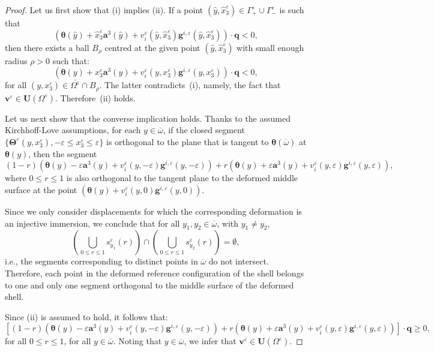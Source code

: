 \documentclass[10pt,a4paper]{amsart}
\begin{document}
\begin{proof}
	Let us first show that (i) implies (ii).
	If a point $(\hat{y},\hat{x}_3^\varepsilon) \in \Gamma^\varepsilon_+ \cup \Gamma^\varepsilon_{-}$ is such that
	$$
	(\bm{\theta}(\hat{y})+\hat{x}_3^\varepsilon \bm{a}^3(\hat{y}) +v_i^\varepsilon(\hat{y},\hat{x}_3^\varepsilon)\bm{g}^{i,\varepsilon}(\hat{y},\hat{x}_3^\varepsilon)) \cdot\bm{q} <0,
	$$
	then there exists a ball $B_\rho$ centred at the given point $(\hat{y},\hat{x}_3^\varepsilon)$ with small enough radius $\rho>0$ such that:
	$$
	(\bm{\theta}(y)+ x_3^\varepsilon \bm{a}^3(y) +v_i^\varepsilon(y,x_3^\varepsilon)\bm{g}^{i,\varepsilon}(y,x_3^\varepsilon)) \cdot\bm{q} <0,
	$$
	for all $(y,x_3^\varepsilon) \in \overline{\Omega^\varepsilon}\cap B_\rho$. The latter contradicts~(i), namely, the fact that $\bm{v}^\varepsilon \in \bm{U}(\Omega^\varepsilon)$. Therefore~(ii) holds.
	
	Let us next show that the converse implication holds. Thanks to the assumed Kirchhoff-Love assumptions, for each $y \in\overline{\omega}$, if the closed segment $\{\bm{\Theta}^\varepsilon(y,x_3^\varepsilon), -\varepsilon \le x_3^\varepsilon \le \varepsilon\}$ is orthogonal to the plane that is tangent to $\bm{\theta}(\overline{\omega})$ at $\bm{\theta}(y)$, then the segment
	$$
	(1-r)\left(\bm{\theta}(y) -\varepsilon\bm{a}^3(y)+v_i^\varepsilon(y,-\varepsilon) \bm{g}^{i,\varepsilon}(y,-\varepsilon)\right)
	+r\left(\bm{\theta}(y) +\varepsilon\bm{a}^3(y)+v_i^\varepsilon(y,\varepsilon) \bm{g}^{i,\varepsilon}(y,\varepsilon)\right),
	$$
	where $0\le r \le 1$ is also orthogonal to the tangent plane to the deformed middle surface at the point $(\bm{\theta}(y)+v_i^\varepsilon(y,0)\bm{g}^{i,\varepsilon}(y,0))$.
	
	Since we only consider displacements for which the corresponding deformation is an injective immersion, we conclude that for all $y_1, y_2 \in \overline{\omega}$, with $y_1 \neq y_2$,
	$$
	\left(\bigcup_{0\le r\le 1} s_{y_1}^\varepsilon(r)\right) \cap \left(\bigcup_{0\le r\le 1} s_{y_2}^\varepsilon(r)\right) = \emptyset,
	$$
	i.e., the segments corresponding to distinct points in $\overline{\omega}$ do not intersect. Therefore, each point in the deformed reference configuration of the shell belongs to one and only one segment orthogonal to the middle surface of the deformed shell.
	
	Since (ii) is assumed to hold, it follows that:
	\begin{equation*}
		\label{confsegm}
		\left[(1-r)\left(\bm{\theta}(y) -\varepsilon\bm{a}^3(y)+v_i^\varepsilon(y,-\varepsilon) \bm{g}^{i,\varepsilon}(y,-\varepsilon)\right)
		+r\left(\bm{\theta}(y) +\varepsilon\bm{a}^3(y)+v_i^\varepsilon(y,\varepsilon) \bm{g}^{i,\varepsilon}(y,\varepsilon)\right)\right] \cdot \bm{q} \ge 0,
	\end{equation*}
	for all $0\le r \le 1$, for all $y \in \overline{\omega}$. Noting that $y\in\overline{\omega}$, we infer that $\bm{v}^\varepsilon \in \bm{U}(\Omega^\varepsilon)$.
\end{proof}
\end{document}
